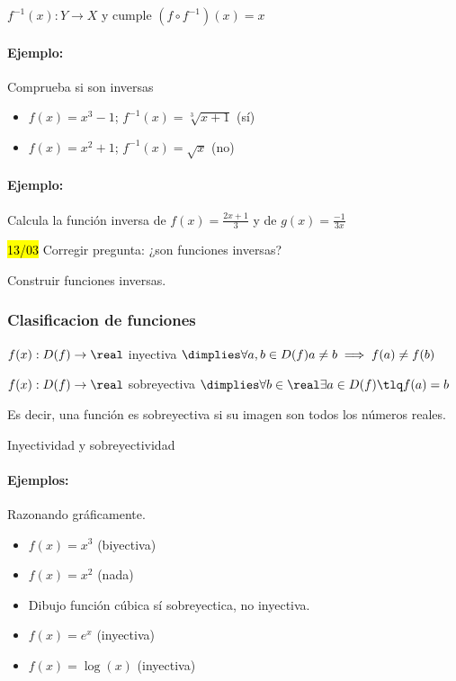  $f^{-1}(x):Y\to X$ y cumple $(f\circ f^{-1})(x) = x$

\paragraph{Ejemplo:} Comprueba si son inversas
\begin{itemize}
	\item $f(x) = x^3-1$; $f^{-1}(x) = \sqrt[3]{x+1}$ (sí)
	\item $f(x) = x^2+1$; $f^{-1}(x) = \sqrt{x}$ (no)
\end{itemize}

\paragraph{Ejemplo:} Calcula la función inversa de $f(x) = \frac{2x+1}{3}$ y de $g(x) = \frac{-1}{3x}$ 

\hl{13/03} Corregir pregunta: ¿son funciones inversas?

Construir funciones inversas.

\subsubsection{Clasificacion de funciones}

\begin{defn}[Inyectividad]
$f(x) : D(f) \to \real$ inyectiva $\dimplies\forall a,b\in D(f) a\neq b \implies f(a) \neq f(b)$
\end{defn} 

\begin{defn}[Sobreyectividad]
	$f(x) : D(f) \to \real$ sobreyectiva $\dimplies \forall b\in\real \exists a\in D(f) \tlq f(a) = b$

	Es decir, una función es sobreyectiva si su imagen son todos los números reales.
\end{defn}


\begin{defn}[Biyectividad] 
	Inyectividad y sobreyectividad
\end{defn}

\paragraph{Ejemplos:} Razonando gráficamente.

\begin{itemize}
	\item $f(x) = x^3$ (biyectiva)
	\item $f(x) = x^2$ (nada)
	\item Dibujo función cúbica sí sobreyectica, no inyectiva.
	\item $f(x) = e^x$ (inyectiva)
	\item $f(x) = \log(x)$ (inyectiva)
\end{itemize}

